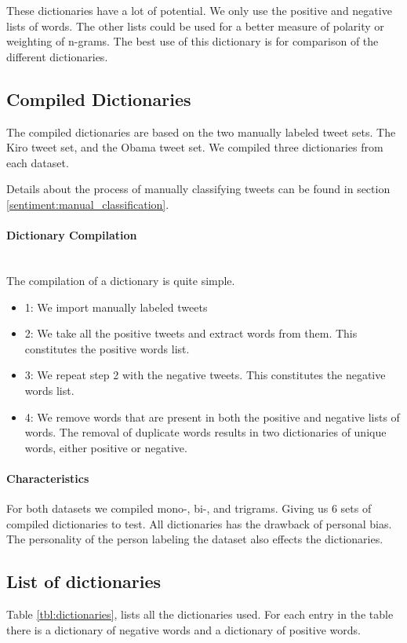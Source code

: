 These dictionaries have a lot of potential. We only use the
positive and negative lists of words. The other lists could be used for a
better measure of polarity or weighting of n-grams. The best use of this
dictionary is for comparison of the different dictionaries.  
%

\subsection{Compiled Dictionaries}\label{data:compiled_dictionaries}
The compiled dictionaries are based on the two manually labeled tweet sets. The
Kiro tweet set, and the Obama tweet set. We compiled three dictionaries from
each dataset. 

Details about the process of manually classifying tweets can be found in section
\ref{sentiment:manual_classification}.

\paragraph{Dictionary Compilation}
\hspace{0pt}\\
The compilation of a dictionary is quite simple. 
\begin{itemize}
    \item 1: We import manually labeled tweets
    \item 2: We take all the positive tweets and extract words from them. This
constitutes the positive words list. 
    \item 3: We repeat step 2 with the negative tweets. This constitutes the
negative words list. 
    \item 4: We remove words that are present in both the positive and negative
lists of words. The removal of duplicate words results in two dictionaries of
unique words, either positive or negative.  
\end{itemize}

\paragraph{Characteristics}
For both datasets we compiled mono-, bi-, and trigrams. Giving us 6 sets of
compiled dictionaries to test. All dictionaries has the drawback of personal
bias. The personality of the person labeling the dataset also effects the
dictionaries. 
%

\subsection{List of dictionaries}
Table \ref{tbl:dictionaries}, lists all the dictionaries used. For each entry in
the table there is a dictionary of negative words and a dictionary of positive
words.  

